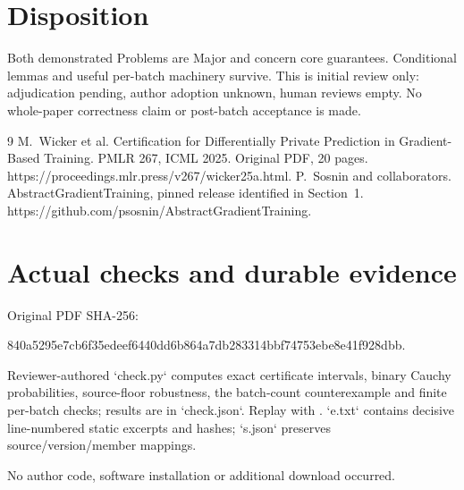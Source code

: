 \documentclass[10pt]{article}
\begin{document}
\section*{Disposition}
Both demonstrated Problems are Major and concern core guarantees. Conditional lemmas and useful per-batch machinery survive. This is initial review only: adjudication pending, author adoption unknown, human reviews empty. No whole-paper correctness claim or post-batch acceptance is made.\par
9 M. Wicker et al. Certification for Differentially Private Prediction in Gradient-Based Training. PMLR 267, ICML 2025. Original PDF, 20 pages. https://proceedings.mlr.press/v267/wicker25a.html. P. Sosnin and collaborators. AbstractGradientTraining, pinned release identified in Section 1. https://github.com/psosnin/AbstractGradientTraining.\par
\section*{Actual checks and durable evidence}
Original PDF SHA-256:\par
840a5295e7cb6f35edeef6440dd6b864a7db283314bbf74753ebe8e41f928dbb.\par
Reviewer-authored `check.py` computes exact certificate intervals, binary Cauchy probabilities, source-floor robustness, the batch-count counterexample and finite per-batch checks; results are in `check.json`. Replay with . `e.txt` contains decisive line-numbered static excerpts and hashes; `s.json` preserves source/version/member mappings.\par
No author code, software installation or additional download occurred.\par
\end{document}
